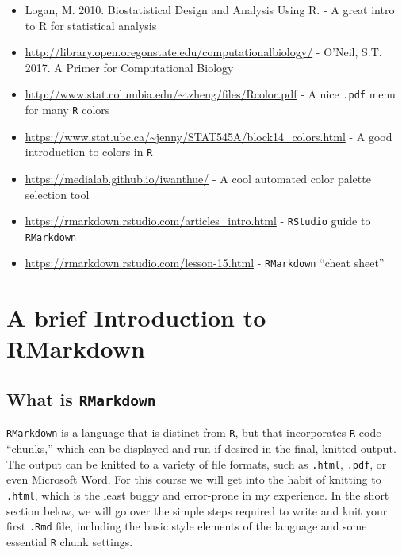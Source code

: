 \documentclass[
]{book}
\begin{document}
\begin{itemize}
\item
  Logan, M. 2010. Biostatistical Design and Analysis Using R. - A great intro to R for statistical analysis
\item
  \url{http://library.open.oregonstate.edu/computationalbiology/} - O'Neil, S.T. 2017. A Primer for Computational Biology
\item
  \url{http://www.stat.columbia.edu/~tzheng/files/Rcolor.pdf} - A nice \texttt{.pdf} menu for many \texttt{R} colors
\item
  \url{https://www.stat.ubc.ca/~jenny/STAT545A/block14_colors.html} - A good introduction to colors in \texttt{R}
\item
  \url{https://medialab.github.io/iwanthue/} - A cool automated color palette selection tool
\item
  \url{https://rmarkdown.rstudio.com/articles_intro.html} - \texttt{RStudio} guide to \texttt{RMarkdown}
\item
  \url{https://rmarkdown.rstudio.com/lesson-15.html} - \texttt{RMarkdown} ``cheat sheet''
\end{itemize}

\hypertarget{a-brief-introduction-to-rmarkdown}{%
\chapter{A brief Introduction to RMarkdown}\label{a-brief-introduction-to-rmarkdown}}

\hypertarget{what-is-rmarkdown}{%
\section{\texorpdfstring{What is \texttt{RMarkdown}}{What is RMarkdown}}\label{what-is-rmarkdown}}

\texttt{RMarkdown} is a language that is distinct from \texttt{R}, but that incorporates \texttt{R} code ``chunks,'' which can be displayed and run if desired in the final, knitted output. The output can be knitted to a variety of file formats, such as \texttt{.html}, \texttt{.pdf}, or even Microsoft Word. For this course we will get into the habit of knitting to \texttt{.html}, which is the least buggy and error-prone in my experience. In the short section below, we will go over the simple steps required to write and knit your first \texttt{.Rmd} file, including the basic style elements of the language and some essential \texttt{R} chunk settings.
\end{document}
